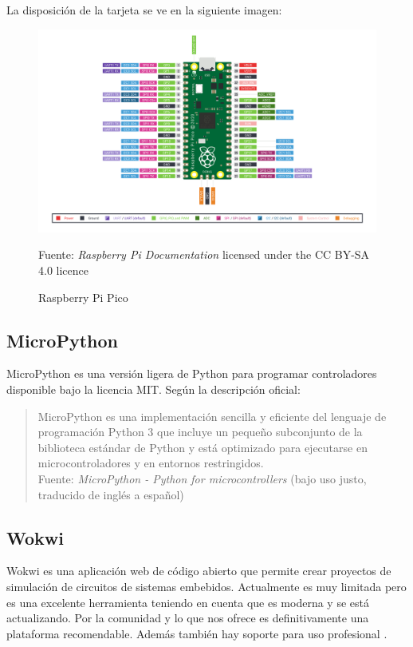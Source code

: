 \documentclass{article}
\begin{document}
    La disposición de la tarjeta se ve en la siguiente imagen:

    \begin{figure}[H]
        \centering
        \includegraphics[width=0.5\paperwidth]{images/pico-r3-sdk11-pinout}
        \caption{Raspberry Pi Pico}\footnotesize
        Fuente: \textit{Raspberry Pi Documentation} licensed under the CC BY-SA 4.0 licence \cite{raspberry-pi-ltd-2022}
    \end{figure}

    \subsection{MicroPython}

    MicroPython es una versión ligera de Python para programar controladores disponible bajo la licencia MIT. Según la descripción oficial:

    \begin{quote}
        MicroPython es una implementación sencilla y eficiente del lenguaje de programación Python 3 que incluye un pequeño subconjunto de la biblioteca estándar de Python y está optimizado para ejecutarse en microcontroladores y en entornos restringidos.\\ \footnotesize
        Fuente: \textit{MicroPython - Python for microcontrollers} (bajo uso justo, traducido de inglés a español)
    \end{quote}

    \subsection{Wokwi}

    Wokwi es una aplicación web de código abierto que permite crear proyectos de simulación de circuitos de sistemas embebidos. Actualmente es muy limitada pero es una excelente herramienta teniendo en cuenta que es moderna y se está actualizando. Por la comunidad y lo que nos ofrece es definitivamente una plataforma recomendable. Además también hay soporte para uso profesional \cite{codemagic-ltd-2022}.
\end{document}

